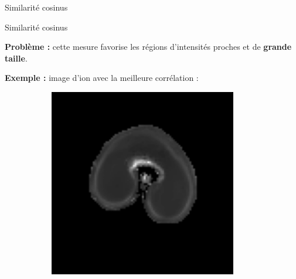 \documentclass[10pt]{beamer}
\begin{document}
\begin{frame}{Similarité cosinus}
\begin{figure}[ht]
  \end{figure}
  
  
\end{frame}

\begin{frame}{Similarité cosinus}

  \textbf{Problème :} cette mesure favorise les régions d'intensités proches et de \textbf{grande taille}.

  \textbf{Exemple :} image d'ion avec la meilleure corrélation :
  
   {
    \begin{figure}[ht]
      \centering
      \begin{subfigure}[t]{0.33\textwidth}
        \centering
        \includegraphics[width=0.9\textwidth]{fig/cosine_mri}
        \caption{}
        \label{subfig:cosine_mri}
      \end{subfigure}%
      \begin{subfigure}[t]{0.33\textwidth}
        \centering

\end{subfigure}
\end{figure}}
\end{frame}
\end{document}
